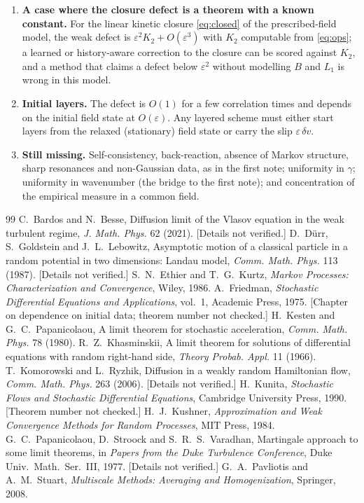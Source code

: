 \documentclass[11pt]{article}
\newcommand{\eps}{\varepsilon}
\theoremstyle{remark}
\begin{document}
\begin{enumerate}
  \item \textbf{A case where the closure defect is a theorem with a known
    constant.} For the linear kinetic closure \eqref{eq:closed} of the
    prescribed-field model, the weak defect is $\eps^2K_2+O(\eps^3)$ with
    $K_2$ computable from \eqref{eq:ops}; a learned or history-aware
    correction to the closure can be scored against $K_2$, and a method
    that claims a defect below $\eps^2$ without modelling $B$ and $L_1$ is
    wrong in this model.
  \item \textbf{Initial layers.} The defect is $O(1)$ for a few correlation
    times and depends on the initial field state at $O(\eps)$. Any layered
    scheme must either start layers from the relaxed (stationary) field
    state or carry the slip $\eps\,\delta v$.
  \item \textbf{Still missing.} Self-consistency, back-reaction, absence
    of Markov structure, sharp resonances and non-Gaussian data, as in the
    first note; uniformity in $\gamma$; uniformity in wavenumber (the
    bridge to the first note); and concentration of the empirical measure
    in a common field.
\end{enumerate}

\begin{thebibliography}{99}
 C.~Bardos and N.~Besse, Diffusion limit of the Vlasov
  equation in the weak turbulent regime, \emph{J. Math. Phys.} 62 (2021).
  [Details not verified.]
 D.~D\"urr, S.~Goldstein and J.~L.~Lebowitz, Asymptotic
  motion of a classical particle in a random potential in two dimensions:
  Landau model, \emph{Comm. Math. Phys.} 113 (1987). [Details not verified.]
 S.~N.~Ethier and T.~G.~Kurtz, \emph{Markov Processes:
  Characterization and Convergence}, Wiley, 1986.
 A.~Friedman, \emph{Stochastic Differential Equations
  and Applications}, vol.~1, Academic Press, 1975. [Chapter on dependence
  on initial data; theorem number not checked.]
 H.~Kesten and G.~C.~Papanicolaou, A limit theorem for
  stochastic acceleration, \emph{Comm. Math. Phys.} 78 (1980).
 R.~Z.~Khasminskii, A limit theorem for solutions of
  differential equations with random right-hand side, \emph{Theory Probab.
  Appl.} 11 (1966).
 T.~Komorowski and L.~Ryzhik, Diffusion in a weakly random
  Hamiltonian flow, \emph{Comm. Math. Phys.} 263 (2006). [Details not
  verified.]
 H.~Kunita, \emph{Stochastic Flows and Stochastic
  Differential Equations}, Cambridge University Press, 1990. [Theorem
  number not checked.]
 H.~J.~Kushner, \emph{Approximation and Weak Convergence
  Methods for Random Processes}, MIT Press, 1984.
 G.~C.~Papanicolaou, D.~Stroock and S.~R.~S.~Varadhan,
  Martingale approach to some limit theorems, in \emph{Papers from the Duke
  Turbulence Conference}, Duke Univ.\ Math.\ Ser.~III, 1977. [Details not
  verified.]
 G.~A.~Pavliotis and A.~M.~Stuart, \emph{Multiscale Methods:
  Averaging and Homogenization}, Springer, 2008.
\end{thebibliography}
\end{document}
